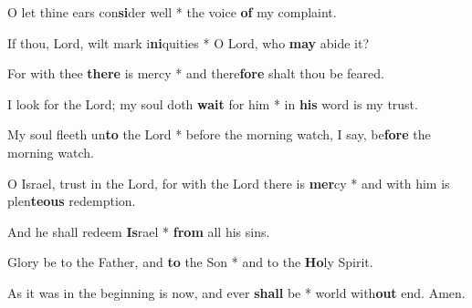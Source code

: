 \begin{multicols}{2}
	O let thine ears con\textbf{si}der well * the voice \textbf{of} my complaint.
	
	If thou, Lord, wilt mark i\textbf{ni}quities * O Lord, who \textbf{may} abide it?
	
	For with thee \textbf{there} is mercy  * and there\textbf{fore} shalt thou be feared.
	
	I look for the Lord; my soul doth \textbf{wait} for him * in \textbf{his} word is my trust.
	
	My soul fleeth un\textbf{to} the Lord * before the morning watch, I say, be\textbf{fore} the morning watch.
	
	O Israel, trust in the Lord, for with the Lord there is \textbf{mer}cy * and with him is plen\textbf{teous} redemption.
	
	And he shall redeem \textbf{Is}rael * \textbf{from} all his sins.
	
	Glory be to the Father, and \textbf{to} the Son * and to the \textbf{Ho}ly Spirit.
	
	As it was in the beginning is now, and ever \textbf{shall} be * world with\textbf{out} end. Amen.
\end{multicols}